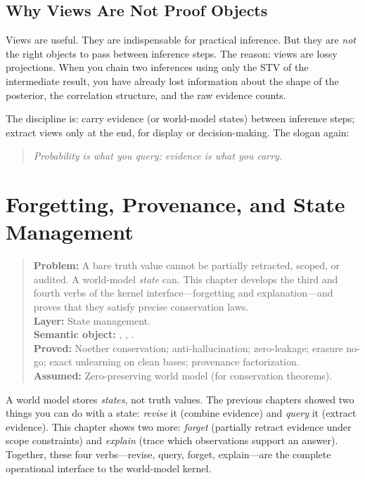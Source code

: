 \documentclass[11pt,openany]{report}
\begin{document}
\section{Why Views Are Not Proof Objects}
\label{sec:views-not-proof}

Views are useful.  They are indispensable for practical inference.  But
they are \emph{not} the right objects to pass between inference steps.
The reason: views are lossy projections.  When you chain two inferences
using only the STV of the intermediate result, you have already lost
information about the shape of the posterior, the correlation structure,
and the raw evidence counts.

The \xiPLN{} discipline is: carry evidence (or world-model states)
between inference steps; extract views only at the end, for display
or decision-making.  The slogan again:

\begin{quote}
\emph{Probability is what you query; evidence is what you carry.}
\end{quote}


\chapter{Forgetting, Provenance, and State Management}
\label{ch:forgetting-provenance}

\begin{quote}\small
\textbf{Problem:} A bare truth value cannot be partially retracted,
scoped, or audited.  A world-model \emph{state} can.  This chapter
develops the third and fourth verbs of the kernel interface---forgetting
and explanation---and proves that they satisfy precise conservation laws.\\[4pt]
\textbf{Layer:} State management.\\
\textbf{Semantic object:} , , .\\
\textbf{Proved:} Noether conservation; anti-hallucination; zero-leakage; erasure no-go; exact unlearning on clean bases; provenance factorization.\\
\textbf{Assumed:} Zero-preserving world model (for conservation theorems).
\end{quote}

A world model stores \emph{states}, not truth values.  The previous
chapters showed two things you can do with a state: \emph{revise} it
(combine evidence) and \emph{query} it (extract evidence).  This chapter
shows two more: \emph{forget} (partially retract evidence under scope
constraints) and \emph{explain} (trace which observations support an
answer).  Together, these four verbs---revise, query, forget,
explain---are the complete operational interface to the world-model
kernel.
\end{document}
